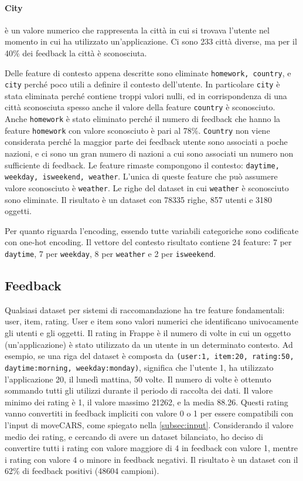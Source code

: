 \documentclass[12pt,italian]{report}
\begin{document}
\paragraph{City} è un valore numerico che rappresenta la città in cui si trovava l'utente nel momento in cui ha utilizzato un'applicazione. Ci sono 233 città diverse, ma per il 40\% dei feedback la città è sconosciuta.  

\bigskip \noindent
Delle feature di contesto appena descritte sono eliminate \texttt{homework, country}, e \texttt{city} perché poco utili a definire il contesto dell'utente. In particolare \texttt{city} è stata eliminata perché contiene troppi valori nulli, ed in corrispondenza di una città sconosciuta spesso anche il valore della feature \texttt{country} è sconosciuto. Anche \texttt{homework} è stato eliminato perché il numero di feedback che hanno la feature \texttt{homework} con valore sconosciuto è pari al 78\%. \texttt{Country} non viene considerata perché la maggior parte dei feedback utente sono associati a poche nazioni, e ci sono un gran numero di nazioni a cui sono associati un numero non sufficiente di feedback.
Le feature rimaste compongono il contesto: \texttt{daytime, weekday, isweekend, weather}. L'unica di queste feature che può assumere valore sconosciuto è \texttt{weather}. Le righe del dataset in cui \texttt{weather} è sconosciuto sono eliminate. Il risultato è un dataset con 78335 righe, 857 utenti e 3180 oggetti.

Per quanto riguarda l'encoding, essendo tutte variabili categoriche sono codificate con one-hot encoding. Il vettore del contesto risultato contiene 24 feature: 7 per \texttt{daytime}, 7 per \texttt{weekday}, 8 per \texttt{weather} e 2 per \texttt{isweekend}.

\subsection{Feedback}
Qualsiasi dataset per sistemi di raccomandazione ha tre feature fondamentali: user, item, rating. User e item sono valori numerici che identificano univocamente gli utenti e gli oggetti. Il rating in Frappe è il numero di volte in cui un oggetto (un'applicazione) è stato utilizzato da un utente in un determinato contesto. Ad esempio, se una riga del dataset è composta da \texttt{(user:1, item:20, rating:50, daytime:morning, weekday:monday)}, significa che l'utente 1, ha utilizzato l'applicazione 20, il lunedì mattina, 50 volte. Il numero di volte è ottenuto sommando tutti gli utilizzi durante il periodo di raccolta dei dati. Il valore minimo dei rating è 1, il valore massimo 21262, e la media 88.26. Questi rating vanno convertiti in feedback impliciti con valore 0 o 1 per essere compatibili con l'input di moveCARS, come spiegato nella \autoref{subsec:input}. Considerando il valore medio dei rating, e cercando di avere un dataset bilanciato, ho deciso di convertire tutti i rating con valore maggiore di 4 in feedback con valore 1, mentre i rating con valore 4 o minore in feedback negativi. Il risultato è un dataset con il 62\% di feedback positivi (48604 campioni).
\end{document}
